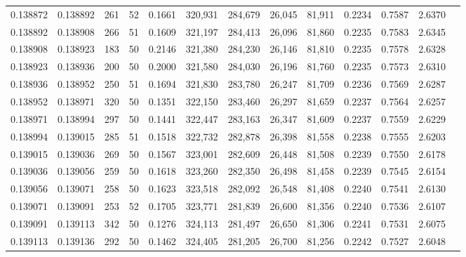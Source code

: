 \begin{tabular}{rrrrrrrrrrrrr}
0.138872 & 0.138892 &   261 &  52 &                                     0.1661 & 320,931 & 284,679 &  26,045 &  81,911 & 0.2234 & 0.7587 & 2.6370 \\
0.138892 & 0.138908 &   266 &  51 &                                     0.1609 & 321,197 & 284,413 &  26,096 &  81,860 & 0.2235 & 0.7583 & 2.6345 \\
0.138908 & 0.138923 &   183 &  50 &                                     0.2146 & 321,380 & 284,230 &  26,146 &  81,810 & 0.2235 & 0.7578 & 2.6328 \\
0.138923 & 0.138936 &   200 &  50 &                                     0.2000 & 321,580 & 284,030 &  26,196 &  81,760 & 0.2235 & 0.7573 & 2.6310 \\
0.138936 & 0.138952 &   250 &  51 &                                     0.1694 & 321,830 & 283,780 &  26,247 &  81,709 & 0.2236 & 0.7569 & 2.6287 \\
0.138952 & 0.138971 &   320 &  50 &                                     0.1351 & 322,150 & 283,460 &  26,297 &  81,659 & 0.2237 & 0.7564 & 2.6257 \\
0.138971 & 0.138994 &   297 &  50 &                                     0.1441 & 322,447 & 283,163 &  26,347 &  81,609 & 0.2237 & 0.7559 & 2.6229 \\
0.138994 & 0.139015 &   285 &  51 &                                     0.1518 & 322,732 & 282,878 &  26,398 &  81,558 & 0.2238 & 0.7555 & 2.6203 \\
0.139015 & 0.139036 &   269 &  50 &                                     0.1567 & 323,001 & 282,609 &  26,448 &  81,508 & 0.2239 & 0.7550 & 2.6178 \\
0.139036 & 0.139056 &   259 &  50 &                                     0.1618 & 323,260 & 282,350 &  26,498 &  81,458 & 0.2239 & 0.7545 & 2.6154 \\
0.139056 & 0.139071 &   258 &  50 &                                     0.1623 & 323,518 & 282,092 &  26,548 &  81,408 & 0.2240 & 0.7541 & 2.6130 \\
0.139071 & 0.139091 &   253 &  52 &                                     0.1705 & 323,771 & 281,839 &  26,600 &  81,356 & 0.2240 & 0.7536 & 2.6107 \\
0.139091 & 0.139113 &   342 &  50 &                                     0.1276 & 324,113 & 281,497 &  26,650 &  81,306 & 0.2241 & 0.7531 & 2.6075 \\
0.139113 & 0.139136 &   292 &  50 &                                     0.1462 & 324,405 & 281,205 &  26,700 &  81,256 & 0.2242 & 0.7527 & 2.6048 \\

\end{tabular}
